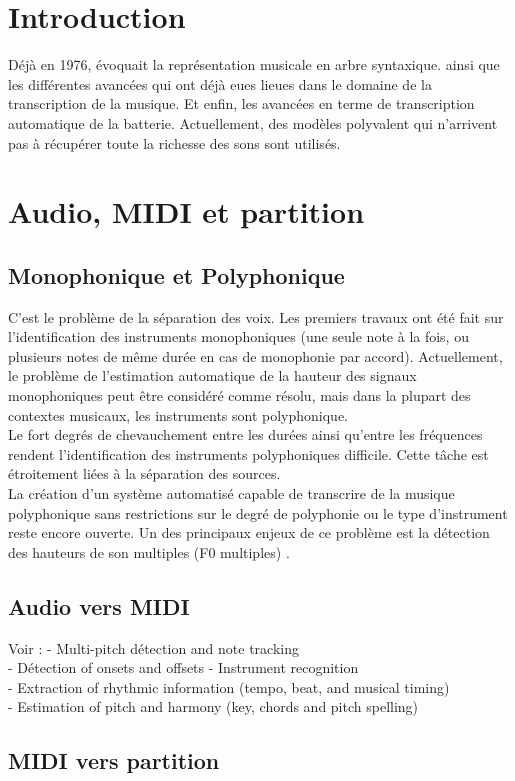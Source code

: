 \section{Introduction}
Déjà en 1976, \cite{first_one} évoquait la représentation musicale en arbre syntaxique. 
 ainsi que les différentes avancées qui ont déjà eues lieues dans le domaine de la transcription de la musique. Et enfin, les avancées en terme de transcription automatique de la batterie. Actuellement, des modèles polyvalent qui n’arrivent pas à récupérer toute la richesse des sons sont utilisés.
\section{Audio, MIDI et partition}
\subsection*{Monophonique et Polyphonique}
C’est le problème de la séparation des voix.
Les premiers travaux ont été fait sur l’identification des instruments monophoniques (une seule note à la fois, ou plusieurs notes de même durée en cas de monophonie par accord). Actuellement, le problème de l'estimation automatique de la hauteur des signaux monophoniques peut être considéré comme résolu, mais dans la plupart des contextes musicaux, les instruments sont polyphonique.\\
Le fort degrés de chevauchement entre les durées ainsi qu’entre les fréquences rendent l’identification des instruments polyphoniques difficile. Cette tâche est étroitement liées à la séparation des sources.\\
La création d'un système automatisé capable de transcrire de la musique polyphonique sans restrictions sur le degré de polyphonie ou le type d'instrument reste encore ouverte. Un des principaux enjeux de ce problème est la détection des hauteurs de son multiples (F0 multiples) \cite{article1}.
\subsection*{Audio vers MIDI}
Voir : \cite{article1}
- Multi-pitch détection and note tracking\\
- Détection of onsets and offsets
- Instrument recognition\\
- Extraction of rhythmic information (tempo, beat, and musical timing)\\
- Estimation of pitch and harmony (key, chords and pitch spelling)
\subsection*{MIDI vers partition}
